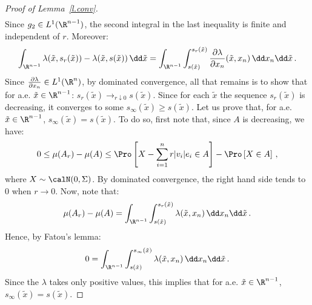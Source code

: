 \begin{proof}[Proof of Lemma~\ref{l.conv}]
\begin{multline*}
\end{multline*}
Since $g_2\in L^1(\R^{n-1})$, the second integral in the last inequality is finite and independent of $r$. Moreover:
\[
\int_{\R^{n-1}}\lambda(\tilde{x},s_r(\tilde{x})) -\lambda(\tilde{x},s(\tilde{x})) \, \dd\tilde{x}=\int_{\R^{n-1}}\int_{s(\tilde{x})}^{s_r(\tilde{x})}\frac{\partial\lambda}{\partial x_n}(\tilde{x},x_n) \, \dd x_n \dd\tilde{x}\,.
\]
Since $\frac{\partial\lambda}{\partial x_n}\in L^1(\R^n)$, by dominated convergence, all that remains is to show that for a.e. $\tilde{x}\in\R^{n-1}$: $s_r(\tilde{x}) \longrightarrow_{r\downarrow 0} s(\tilde{x})$. Since for each $\tilde{x}$ the sequence $s_r(\tilde{x})$ is decreasing, it converges to some $s_\infty(\tilde{x}) \geq s(\tilde{x})$. Let us prove that, for a.e. $\tilde{x}\in\R^{n-1}$, $s_\infty(\tilde{x})=s(\tilde{x})$. To do so, first note that, since $A$ is decreasing, we have:
\[
0 \leq \mu(A_r) - \mu(A) \leq \Pro \left[X - \sum_{i=1}^n r |v_i|e_i \in A \right] - \Pro \left[X \in A \right] \,,
\]
where $X \sim \calN(0,\Sigma)$. By dominated convergence, the right hand side tends to $0$ when $r\rightarrow 0$. Now, note that:
\[
\mu(A_r)-\mu(A) = \int_{\R^{n-1}} \int_{s(\tilde{x})}^{s_r(\tilde{x})} \lambda(\tilde{x},x_n) \, \dd x_n \dd\tilde{x} \,.
\]
Hence, by Fatou's lemma:
\[
0 = \int_{\R^{n-1}} \int_{s(\tilde{x})}^{s_\infty(\tilde{x})} \lambda(\tilde{x},x_n) \, \dd x_n \dd\tilde{x} \,.
\]
Since the $\lambda$ takes only positive values, this implies that for a.e. $\tilde{x}\in\R^{n-1}$, $s_\infty(\tilde{x})=s(\tilde{x})$.
\end{proof}
